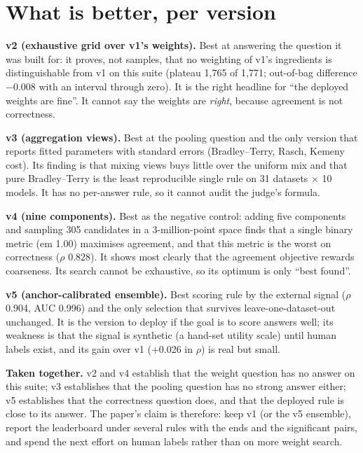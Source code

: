 \documentclass[11pt]{article}
\begin{document}
\section{What is better, per version}
\begin{description}[style=unboxed,leftmargin=0pt]
\item[] \textbf{v2 (exhaustive grid over v1's weights).} Best at answering the question it was built for: it proves, not samples, that no weighting of v1's ingredients is distinguishable from v1 on this suite (plateau 1,765 of 1,771; out-of-bag difference $-0.008$ with an interval through zero). It is the right headline for ``the deployed weights are fine''. It cannot say the weights are \emph{right}, because agreement is not correctness.
\item[] \textbf{v3 (aggregation views).} Best at the pooling question and the only version that reports fitted parameters with standard errors (Bradley--Terry, Rasch, Kemeny cost). Its finding is that mixing views buys little over the uniform mix and that pure Bradley--Terry is the least reproducible single rule on 31 datasets $\times$ 10 models. It has no per-answer rule, so it cannot audit the judge's formula.
\item[] \textbf{v4 (nine components).} Best as the negative control: adding five components and sampling 305 candidates in a 3-million-point space finds that a single binary metric (em 1.00) maximises agreement, and that this metric is the worst on correctness ($\rho$ 0.828). It shows most clearly that the agreement objective rewards coarseness. Its search cannot be exhaustive, so its optimum is only ``best found''.
\item[] \textbf{v5 (anchor-calibrated ensemble).} Best scoring rule by the external signal ($\rho$ 0.904, AUC 0.996) and the only selection that survives leave-one-dataset-out unchanged. It is the version to deploy if the goal is to score answers well; its weakness is that the signal is synthetic (a hand-set utility scale) until human labels exist, and its gain over v1 (+0.026 in $\rho$) is real but small.
\item[] \textbf{Taken together.} v2 and v4 establish that the weight question has no answer on this suite; v3 establishes that the pooling question has no strong answer either; v5 establishes that the correctness question does, and that the deployed rule is close to its answer. The paper's claim is therefore: keep v1 (or the v5 ensemble), report the leaderboard under several rules with the ends and the significant pairs, and spend the next effort on human labels rather than on more weight search.
\end{description}
\end{document}
